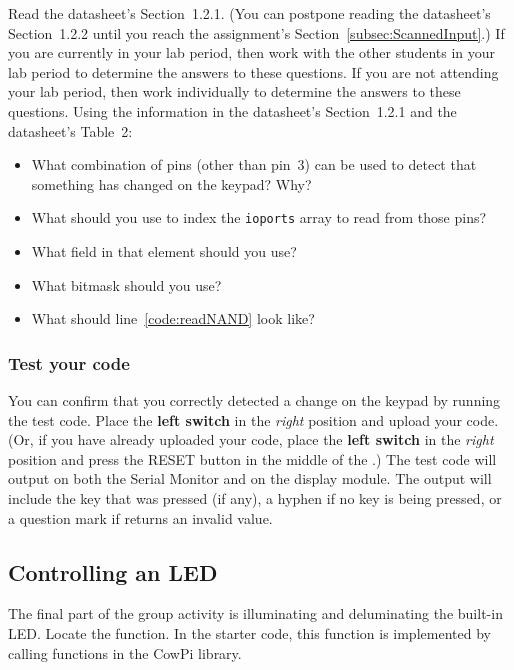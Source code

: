 Read the datasheet's Section~1.2.1.
(You can postpone reading the datasheet's Section~1.2.2 until you reach the assignment's Section~\ref{subsec:ScannedInput}.)
If you are currently in your lab period, then work with the other students in your lab period to determine the answers to these questions.
If you are not attending your lab period, then work individually to determine the answers to these questions.
Using the information in the datasheet's Section~1.2.1 and the datasheet's Table~2:
\begin{itemize}
    \item What combination of pins (other than pin~3) can be used to detect that something has changed on the keypad?
        Why?
    \item What should you use to index the \lstinline{ioports} array to read from those pins?
    \item What field in that element should you use?
    \item What bitmask should you use?
    \item What should line~\ref{code:readNAND} look like?
\end{itemize}

\subsubsection*{Test your code}

You can confirm that you correctly detected a change on the keypad by running the test code.
Place the \textbf{left switch} in the \textit{right} position and upload your code.
(Or, if you have already uploaded your code, place the \textbf{left switch} in the \textit{right} position and press the RESET button in the middle of the \developmentboard.)
The test code will output on both the Serial Monitor and on the display module.
The output will include the key that was pressed (if any), a hyphen if no key is being pressed, or a question mark if  returns an invalid value.


\subsection{Controlling an LED}

The final part of the group activity is illuminating and deluminating the built-in LED\@.
Locate the  function.
In the starter code, this function is implemented by calling functions in the CowPi library.

